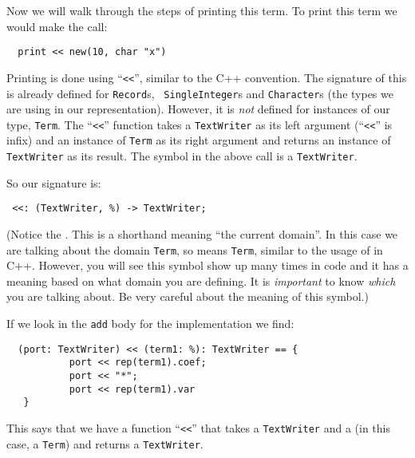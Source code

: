 Now we will walk through the steps of printing this term.
To print this term we would make the call:

\begin{small}
\begin{verbatim}
  print << new(10, char "x")
\end{verbatim}
\end{small}

Printing is done using ``\verb+<<+'', similar to the C++ convention.
The signature of this is already defined for {\tt Record}s, {\tt
SingleInteger}s and \verb"Character"s (the types we are using in our
representation). However, it is {\em not\/} defined for instances of
our type, \verb"Term". The ``\verb+<<+'' function takes a \verb"TextWriter" as its
left argument (``\verb+<<+'' is infix) and an instance of \verb"Term" as its
right argument and returns an instance of \verb"TextWriter" as its result.
The symbol  in the above call is a \verb"TextWriter".

So our signature is:
 
\begin{small}
\begin{verbatim}
 <<: (TextWriter, %) -> TextWriter;
\end{verbatim}
\end{small}

(Notice the \ttin{\%}. This is a shorthand meaning ``the current domain''.
 In this case we are talking about the domain \verb"Term", so \ttin{\%} means \verb"Term",
 similar to the usage of  in C++.
 However, you will see this symbol show up many times in \asharp{} code
 and it has a meaning based on what domain you are defining. It is
 {\em important} to know {\em which} \ttin{\%} you are talking about. 
 Be very careful about the meaning of this symbol.)

If we look in the \verb"add" body for the implementation we find:

\begin{small}
\begin{verbatim}
  (port: TextWriter) << (term1: %): TextWriter == {
           port << rep(term1).coef;
           port << "*";
           port << rep(term1).var
   }
\end{verbatim}
\end{small}

This says that we have a function ``\verb+<<+'' that takes a \verb"TextWriter" and a 
\ttin{\%} (in this case, a \verb"Term") and returns a \verb"TextWriter". 

